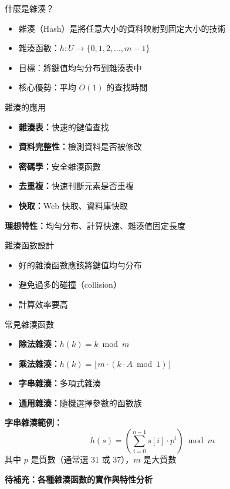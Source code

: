 \documentclass{beamer}
\begin{document}
\begin{frame}{什麼是雜湊？}
\begin{itemize}
    \item 雜湊（Hash）是將任意大小的資料映射到固定大小的技術
    \item 雜湊函數：$h: U \rightarrow \{0, 1, 2, ..., m-1\}$
    \item 目標：將鍵值均勻分布到雜湊表中
    \item 核心優勢：平均 $O(1)$ 的查找時間
\end{itemize}

\vspace{1em}
\begin{block}{雜湊的應用}
\begin{itemize}
    \item \textbf{雜湊表：}快速的鍵值查找
    \item \textbf{資料完整性：}檢測資料是否被修改
    \item \textbf{密碼學：}安全雜湊函數
    \item \textbf{去重複：}快速判斷元素是否重複
    \item \textbf{快取：}Web 快取、資料庫快取
\end{itemize}
\end{block}

\vspace{1em}
\textbf{理想特性：}均勻分布、計算快速、雜湊值固定長度
\end{frame}

\begin{frame}{雜湊函數設計}
\begin{itemize}
    \item 好的雜湊函數應該將鍵值均勻分布
    \item 避免過多的碰撞（collision）
    \item 計算效率要高
\end{itemize}

\vspace{1em}
\begin{block}{常見雜湊函數}
\begin{itemize}
    \item \textbf{除法雜湊：}$h(k) = k \bmod m$
    \item \textbf{乘法雜湊：}$h(k) = \lfloor m \cdot (k \cdot A \bmod 1) \rfloor$
    \item \textbf{字串雜湊：}多項式雜湊
    \item \textbf{通用雜湊：}隨機選擇參數的函數族
\end{itemize}
\end{block}

\vspace{1em}
\textbf{字串雜湊範例：}
$$h(s) = \left( \sum_{i=0}^{n-1} s[i] \cdot p^i \right) \bmod m$$
其中 $p$ 是質數（通常選 31 或 37），$m$ 是大質數

\vspace{1em}
\textbf{待補充：各種雜湊函數的實作與特性分析}
\end{frame}
\end{document}
